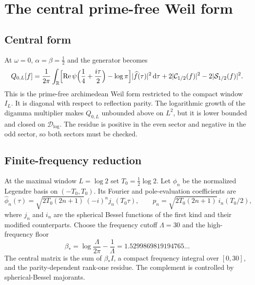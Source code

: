 \documentclass[11pt,a4paper]{article}
\newcommand{\R}{\mathbb R}
\newcommand{\Dlog}{\mathcal D_{\log}}
\renewcommand{\Re}{\operatorname{Re}}
\newcommand{\dd}{\,\mathrm d}
\newcommand{\Cc}{\mathcal C}
\newcommand{\Ss}{\mathcal S}
\DeclarePairedDelimiter{\abs}{\lvert}{\rvert}
\theoremstyle{plain}
\theoremstyle{definition}
\numberwithin{equation}{section}
\begin{document}
\section{The central prime-free Weil form}

\subsection{Central form}

At $\omega=0$, $\alpha=\beta=\tfrac12$ and the generator becomes
\begin{equation}\label{eq:Q0}
Q_{0,L}[f]=\frac1{2\pi}\int_\R\Bigl[\Re\psi\Bigl(\frac14+\frac{i\tau}2\Bigr)-\log\pi\Bigr]
\abs{\widehat f(\tau)}^2\dd\tau
+2\abs{\Cc_{1/2}(f)}^2-2\abs{\Ss_{1/2}(f)}^2 .
\end{equation}
This is the prime-free archimedean Weil form restricted to the compact window
$I_L$. It is diagonal with respect to reflection parity. The logarithmic
growth of the digamma multiplier makes $Q_{0,L}$ unbounded above on $L^2$,
but it is lower bounded and closed on $\Dlog$. The residue is positive in the
even sector and negative in the odd sector, so both sectors must be checked.

\subsection{Finite-frequency reduction}

At the maximal window $L=\log2$ set $T_0=\tfrac12\log2$. Let $\phi_n$ be the
normalized Legendre basis on $(-T_0,T_0)$. Its Fourier and pole-evaluation
coefficients are
\begin{equation}
\widehat\phi_n(\tau)=\sqrt{2T_0(2n+1)}\,(-i)^n j_n(T_0\tau),
\qquad
p_n=\sqrt{2T_0(2n+1)}\,i_n(T_0/2),
\end{equation}
where $j_n$ and $i_n$ are the spherical Bessel functions of the first kind and
their modified counterparts. Choose the frequency cutoff $\Lambda=30$ and the
high-frequency floor
\begin{equation}
\beta_*=\log\frac{\Lambda}{2\pi}-\frac1\Lambda=1.5299869819194765\ldots
\end{equation}
The central matrix is the sum of $\beta_*I$, a compact frequency integral
over $[0,30]$, and the parity-dependent rank-one residue. The complement is
controlled by spherical-Bessel majorants.
\end{document}
